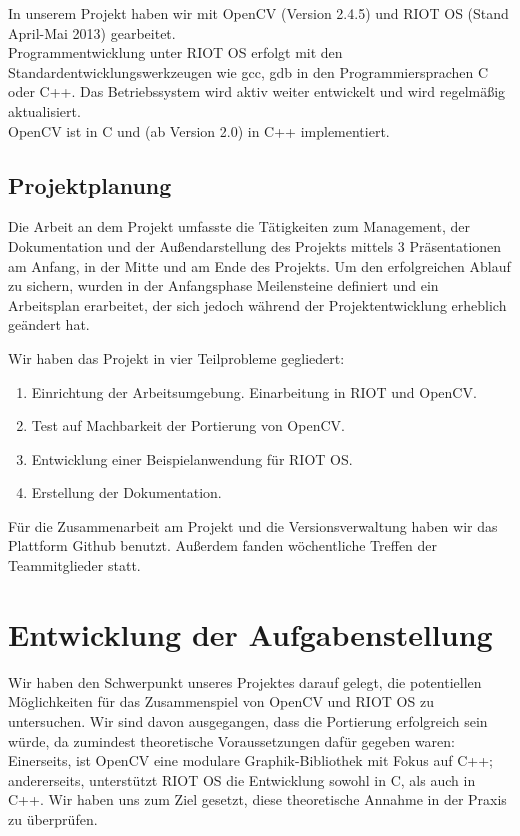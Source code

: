\documentclass[10pt,a4paper]{article}
\begin{document}
In unserem Projekt haben wir mit OpenCV (Version 2.4.5) und RIOT OS (Stand April-Mai 2013) gearbeitet.  \\

Programmentwicklung unter RIOT OS erfolgt mit den Standardentwicklungswerkzeugen wie gcc, gdb in den Programmiersprachen C oder C++. Das Betriebssystem wird aktiv weiter entwickelt und wird regelmäßig aktualisiert. \\

OpenCV ist in C und (ab Version 2.0) in C++ implementiert.

\subsection{Projektplanung}

Die Arbeit an dem Projekt umfasste die Tätigkeiten zum Management, der Dokumentation und der Außendarstellung des Projekts mittels 3 Präsentationen am Anfang, in der Mitte und am Ende des Projekts. Um den erfolgreichen Ablauf zu sichern, wurden in der Anfangsphase Meilensteine definiert und ein Arbeitsplan erarbeitet, der sich jedoch während der Projektentwicklung erheblich geändert hat. 

Wir haben das Projekt in vier Teilprobleme gegliedert:
\begin{enumerate}
\item Einrichtung der Arbeitsumgebung. Einarbeitung in RIOT und OpenCV.
\item Test auf Machbarkeit der Portierung von OpenCV.
\item Entwicklung einer Beispielanwendung für RIOT OS.
\item Erstellung der Dokumentation.
\end{enumerate}

Für die Zusammenarbeit am Projekt und die Versionsverwaltung haben wir das Plattform Github benutzt. Außerdem fanden wöchentliche Treffen der Teammitglieder statt. \\


\newpage
\section{Entwicklung der Aufgabenstellung}

Wir haben den Schwerpunkt unseres Projektes darauf gelegt, die potentiellen Möglichkeiten für das Zusammenspiel von OpenCV und RIOT OS zu untersuchen. Wir sind davon ausgegangen, dass die Portierung erfolgreich sein würde, da zumindest theoretische Voraussetzungen dafür gegeben waren: Einerseits, ist OpenCV eine modulare Graphik-Bibliothek mit Fokus auf C++; andererseits, unterstützt RIOT OS die Entwicklung sowohl in C, als auch in C++. Wir haben uns zum Ziel gesetzt, diese theoretische Annahme in der Praxis zu überprüfen. \newline
\end{document}
